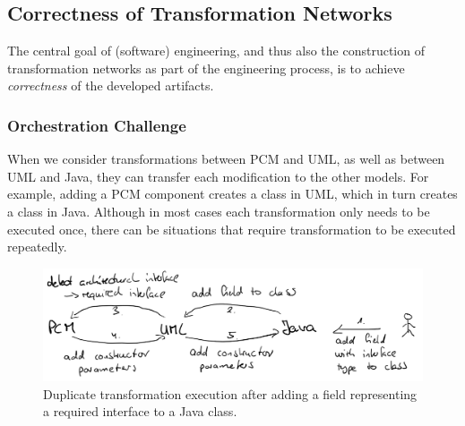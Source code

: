 \subsection{Correctness of Transformation Networks}

The central goal of (software) engineering, and thus also the construction of transformation networks as part of the engineering process, is to achieve \emph{correctness} of the developed artifacts.

\subsubsection*{Orchestration Challenge}
\label{chap:introduction:challenges:correctness:orchestration}

When we consider transformations between \gls{PCM} and \gls{UML}, as well as between \gls{UML} and Java, they can transfer each modification to the other models.
For example, adding a \gls{PCM} component creates a class in \gls{UML}, which in turn creates a class in Java.
Although in most cases each transformation only needs to be executed once, there can be situations that require transformation to be executed repeatedly.

\begin{figure}
    \centering
    \includegraphics[width=\textwidth]{figures/prologue/introduction/scenario_duplicate_execution.png}
    \caption[Example for transformation orchestration]{Duplicate transformation execution after adding a field representing a required interface to a Java class.}
    \label{fig:introduction:scenario_duplicate_execution}
\end{figure}

